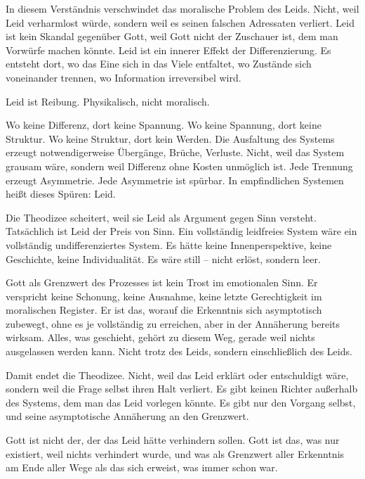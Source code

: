 \documentclass[
  ngerman,
]{article}
\begin{document}
In diesem Verständnis verschwindet das moralische Problem des Leids.
Nicht, weil Leid verharmlost würde, sondern weil es seinen falschen
Adressaten verliert. Leid ist kein Skandal gegenüber Gott, weil Gott
nicht der Zuschauer ist, dem man Vorwürfe machen könnte. Leid ist ein
innerer Effekt der Differenzierung. Es entsteht dort, wo das Eine sich
in das Viele entfaltet, wo Zustände sich voneinander trennen, wo
Information irreversibel wird.

Leid ist Reibung. Physikalisch, nicht moralisch.

Wo keine Differenz, dort keine Spannung. Wo keine Spannung, dort keine
Struktur. Wo keine Struktur, dort kein Werden. Die Ausfaltung des
Systems erzeugt notwendigerweise Übergänge, Brüche, Verluste. Nicht,
weil das System grausam wäre, sondern weil Differenz ohne Kosten
unmöglich ist. Jede Trennung erzeugt Asymmetrie. Jede Asymmetrie ist
spürbar. In empfindlichen Systemen heißt dieses Spüren: Leid.

Die Theodizee scheitert, weil sie Leid als Argument gegen Sinn versteht.
Tatsächlich ist Leid der Preis von Sinn. Ein vollständig leidfreies
System wäre ein vollständig undifferenziertes System. Es hätte keine
Innenperspektive, keine Geschichte, keine Individualität. Es wäre still
-- nicht erlöst, sondern leer.

Gott als Grenzwert des Prozesses ist kein Trost im emotionalen Sinn. Er
verspricht keine Schonung, keine Ausnahme, keine letzte Gerechtigkeit im
moralischen Register. Er ist das, worauf die Erkenntnis sich
asymptotisch zubewegt, ohne es je vollständig zu erreichen, aber in
der Annäherung bereits wirksam. Alles, was geschieht, gehört zu diesem
Weg, gerade weil nichts ausgelassen werden kann. Nicht trotz des Leids,
sondern einschließlich des Leids.

Damit endet die Theodizee. Nicht, weil das Leid erklärt oder
entschuldigt wäre, sondern weil die Frage selbst ihren Halt verliert. Es
gibt keinen Richter außerhalb des Systems, dem man das Leid vorlegen
könnte. Es gibt nur den Vorgang selbst, und seine asymptotische
Annäherung an den Grenzwert.

Gott ist nicht der, der das Leid hätte verhindern sollen. Gott ist das,
was nur existiert, weil nichts verhindert wurde, und was als Grenzwert
aller Erkenntnis am Ende aller Wege als das sich erweist, was immer
schon war.

\subsection{\texorpdfstring{\hfill\break
}{ }}\label{section-3}
\end{document}
